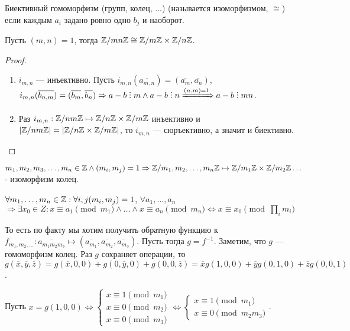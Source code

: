 \begin{definition}
    Биективный гомоморфизм (групп, колец, ...) (называется изоморфизмом, $\cong$) если каждым $a_i$ задано ровно одно  $b_j$ и наоборот.
\end{definition}
\begin{theorem}
    Пусть $(m, n)=1$, тогда $\mathbb{Z} / mn \mathbb{Z} \cong \mathbb{Z} / m\mathbb{Z} \times \mathbb{Z} / n \mathbb{Z}$.
\end{theorem}
\begin{proof}
    \slashn
    \begin{enumerate}
        \item $i_{m,n}$ --- инъективно. Пусть $i_{m,n}(\overline{a_{m,n}}) = (\overline{a_m}, \overline{a_n})$,  $i_{m,n}(\overline{b_{n, m}}) = (\overline{b_m}, \overline{b_n}) \Rightarrow  a-b \divby m \land a-b\divby n \xRightarrow{(n, m) = 1} a - b \divby mn$.
        \item Раз $i_{m, n}: \mathbb{Z} / nm\mathbb{Z} \mapsto \mathbb{Z} / n\mathbb{Z} \times \mathbb{Z} / m\mathbb{Z}$ инъективно и $|\mathbb{Z} / nm\mathbb{Z}| = |\mathbb{Z} / n\mathbb{Z} \times \mathbb{Z} / m\mathbb{Z}|$, то $i_{m, n}$ --- сюръективно, а значит и биективно.
    \end{enumerate}
\end{proof}
\begin{theorem}[КТО 2]
    $m_1,m_2,m_3,\ldots,m_n \in \mathbb{Z} \land (m_i, m_j) = 1 \Rightarrow \mathbb{Z} / m_1,m_2,\ldots,m_n \mathbb{Z} \mapsto \mathbb{Z} / m_1\mathbb{Z} \times \mathbb{Z} / m_2\mathbb{Z} \ldots$ - изоморфизм колец. 
\end{theorem}
\begin{theorem}
	$\forall m_1, \ldots, m_n \in \mathbb{Z}: \forall i, j (m_i, m_j) = 1$, $\forall a_1, \ldots, a_n$ $\Rightarrow \exists x_0 \in Z: x \equiv a_1 \pmod{m_1} \land \ldots \land x \equiv a_n \pmod{m_n} \iff x \equiv x_0 \pmod {\prod_i m_i}$
\end{theorem}
\slashn
То есть по факту мы хотим получить обратную функцию к $f_{m_1,m_2,\ldots}: \overline{a_{m_1m_2m_3}} \mapsto (\overline{a_{m_1}}, \overline{a_{m_2}}, \overline{a_{m_3}})$. Пусть тогда $g=f^{-1}$. Заметим, что  $g$ --- гомоморфизм колец. Раз  $g$ сохраняет операции, то  $g(\overline{x}, \overline{y}, \overline{z}) = g(\overline{x}, 0, 0) + g(0, \overline{y}, 0) + g(0, 0, \overline{z}) = \overline{x}g(1, 0, 0) + \overline{y}g(0, 1, 0) + \overline{z}g(0, 0, 1)$.

Пусть  $x=g(1, 0, 0) \iff \begin{cases} x \equiv 1 \pmod{m_1} \\ x \equiv 0 \pmod{m_2} \\ x \equiv 0 \pmod{m_3} \end{cases} \iff \begin{cases} x \equiv 1 \pmod{m_1} \\ x \equiv 0 \pmod{m_2m_3} \end{cases}$.

